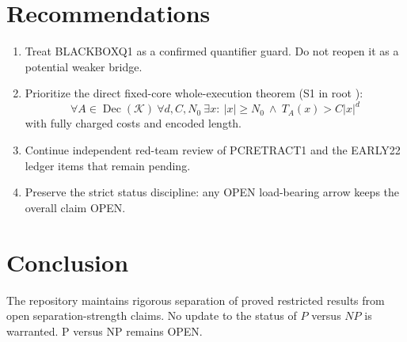 \documentclass[11pt]{article}
\begin{document}
\section{Recommendations}
\begin{enumerate}
\item Treat BLACKBOXQ1 as a confirmed quantifier guard.  Do not reopen it as a
potential weaker bridge.
\item Prioritize the direct fixed-core whole-execution theorem (S1 in root
):
\[
\forall A\in\operatorname{Dec}(\mathcal K)\ \forall d,C,N_0\ \exists x:\
|x|\ge N_0\ \land\ T_A(x)>C|x|^d
\]
with fully charged costs and encoded length.
\item Continue independent red-team review of PCRETRACT1 and the EARLY22 ledger
items that remain pending.
\item Preserve the strict status discipline: any OPEN load-bearing arrow keeps
the overall claim OPEN.
\end{enumerate}

\section{Conclusion}
The repository maintains rigorous separation of proved restricted results from
open separation-strength claims.  No update to the status of \(P\) versus \(NP\)
is warranted.  P versus NP remains OPEN.

\end{document}
